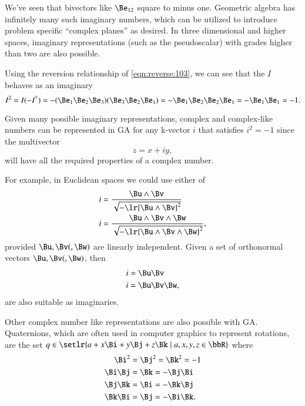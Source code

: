 %
%
We've seen that bivectors like \( \Be_{12} \) square to minus one.
Geometric algebra has infinitely many such imaginary numbers, which can be utilized to introduce problem specific ``complex planes'' as desired.
In three dimensional and higher spaces, imaginary representations
(such as the  pseudoscalar) with grades higher than two are also possible.

Using the reversion relationship of \cref{eqn:reverse:103}, we can see that the \( I \) behaves as an imaginary
\begin{dmath}\label{eqn:complex:3310}
I^2
=
I (-I^\dagger)
=
-
(\Be_1 \Be_2 \Be_3)(\Be_3 \Be_2 \Be_1)
=
-
\Be_1 \Be_2 \Be_2 \Be_1
=
-
\Be_1 \Be_1
=
-1.
\end{dmath}

Given many possible imaginary representations, complex and complex-like numbers can be represented in GA for any k-vector \( i \) that satisfies \( i^2 = -1 \) since the multivector
\begin{dmath}\label{eqn:complex:260}
z = x + i y,
\end{dmath}
will have all the required properties of a complex number.

For example, in Euclidean spaces we could use either of
\begin{dmath}\label{eqn:complex:280}
\begin{aligned}
i &= \frac{\Bu \wedge \Bv}{\sqrt{-\lr{\Bu\wedge\Bv}^2}} \\
i &= \frac{\Bu \wedge \Bv \wedge \Bw}{\sqrt{-\lr{\Bu\wedge\Bv\wedge \Bw}^2}},
\end{aligned}
\end{dmath}
provided \( \Bu, \Bv (,\Bw) \) are linearly independent.
Given a set of orthonormal vectors \( \Bu, \Bv (,\Bw) \), then
\begin{dmath}\label{eqn:complex:300}
\begin{aligned}
i &= \Bu \Bv \\
i &= \Bu \Bv \Bw,
\end{aligned}
\end{dmath}
are also suitable as imaginaries.

Other complex number like representations are also possible with GA.
Quaternions, which are often used in computer graphics to represent rotations,
are the set \( q \in \setlr{ a + x \Bi + y \Bj + z \Bk \mid a, x, y, z \in \bbR} \) where
\begin{equation}\label{eqn:complex:1240}
\begin{aligned}
\Bi^2 &= \Bj^2 = \Bk^2 = -1 \\
\Bi \Bj &= \Bk = -\Bj \Bi \\
\Bj \Bk &= \Bi = -\Bk \Bj \\
\Bk \Bi &= \Bj = -\Bi \Bk.
\end{aligned}
\end{equation}

